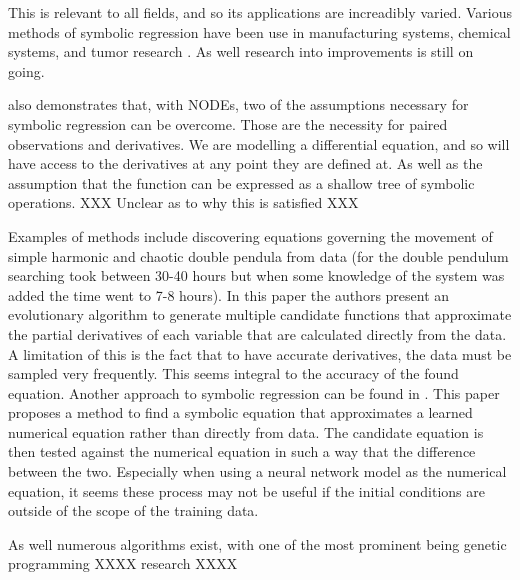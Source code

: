 \documentclass[12pt]{amsart}
\begin{document}
    This is relevant to all fields, and so its applications are increadibly varied. Various methods of symbolic regression have been use in manufacturing systems, chemical systems, and tumor research \cite{can2011comparison,keith2021combining,yoshihara2013inferring}. As well research into improvements is still on going.

    \cite{kidger2022neural} also demonstrates that, with NODEs, two of the assumptions necessary for symbolic regression can be overcome. Those are the necessity for paired observations and derivatives. We are modelling a differential equation, and so will have access to the derivatives at any point they are defined at. As well as the assumption that the function can be expressed as a shallow tree of symbolic operations. XXX Unclear as to why this is satisfied XXX 

    Examples of methods include discovering equations governing the movement of simple harmonic and chaotic double pendula from data\cite{schmidt2009distilling} (for the double pendulum searching took between 30-40 hours but when some knowledge of the system was added the time went to 7-8 hours). In this paper the authors present an evolutionary algorithm to generate multiple candidate functions that approximate the partial derivatives of each variable that are calculated directly from the data. A limitation of this is the fact that to have accurate derivatives, the data must be sampled very frequently. This seems integral to the accuracy of the found equation. Another approach to symbolic regression can be found in \cite{bongard2007automated}. This paper proposes a method to find a symbolic equation that approximates a learned numerical equation rather than directly from data. The candidate equation is then tested against the numerical equation in such a way that the difference between the two. Especially when using a neural network model as the numerical equation, it seems these process may not be useful if the initial conditions are outside of the scope of the training data.

    As well numerous algorithms exist, with one of the most prominent being genetic programming XXXX research XXXX

 

    \printbibliography
\end{document}
